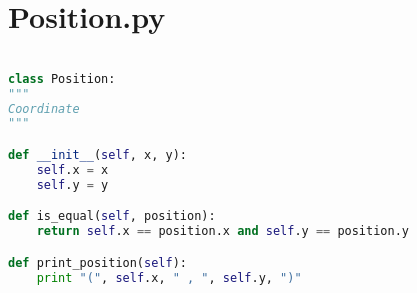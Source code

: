 \documentclass[11pt,times,oneside,openright,hardcopy]{eeereport}
\begin{document}
\section{Position.py}
\begin{lstlisting}[language=Python]

class Position:
"""
Coordinate
"""

def __init__(self, x, y):
	self.x = x
	self.y = y

def is_equal(self, position):
	return self.x == position.x and self.y == position.y

def print_position(self):
	print "(", self.x, " , ", self.y, ")"

\end{lstlisting}
\end{document}
